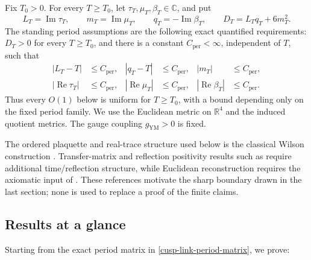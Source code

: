 \documentclass[11pt]{article}
\theoremstyle{definition}
\numberwithin{equation}{section}
\begin{document}
Fix \(T_0>0\).  For every \(T\geq T_0\), let
\(\tau_T,\mu_T,\beta_T\in\mathbb C\), and put
\[
 L_T=\operatorname{Im}\tau_T,\qquad
 m_T=\operatorname{Im}\mu_T,\qquad
 q_T=-\operatorname{Im}\beta_T,\qquad
 D_T=L_Tq_T+6m_T^2.
\]
The standing period assumptions are the following exact quantified
requirements: \(D_T>0\) for every \(T\geq T_0\), and there is a constant
\(C_{\mathrm{per}}<\infty\), independent of \(T\), such that
\begin{equation}
 \label{exact-standing-period-assumptions}
 \begin{aligned}
 |L_T-T|&\leq C_{\mathrm{per}},&
 |q_T-T|&\leq C_{\mathrm{per}},&
 |m_T|&\leq C_{\mathrm{per}},\\
 |\operatorname{Re}\tau_T|&\leq C_{\mathrm{per}},&
 |\operatorname{Re}\mu_T|&\leq C_{\mathrm{per}},&
 |\operatorname{Re}\beta_T|&\leq C_{\mathrm{per}}.
 \end{aligned}
\end{equation}
Thus every \(O(1)\) below is uniform for \(T\geq T_0\), with a bound
depending only on the fixed period family.  We use the Euclidean metric on
\(\mathbb R^4\) and the induced quotient metrics.  The gauge coupling
\(g_{\mathrm{YM}}>0\) is fixed.

The ordered plaquette and real-trace structure used below is the classical
Wilson construction \cite{Wilson_1974}.  Transfer-matrix and reflection
positivity results such as \cite{Luscher_1977,MenottiPelissetto_1987} require
additional time/reflection structure, while Euclidean reconstruction
requires the axiomatic input of
\cite{OsterwalderSchrader_1973,OsterwalderSchrader_1975}.  These references
motivate the sharp boundary drawn in the last section; none is used to
replace a proof of the finite claims.

\subsection*{Results at a glance}

Starting from the exact period matrix in
\eqref{cusp-link-period-matrix}, we prove:
\end{document}
